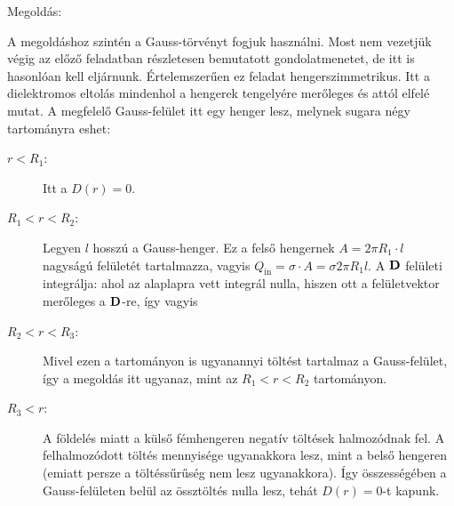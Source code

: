 
\ifdefined\megoldas

 Megoldás: 

 A megoldáshoz szintén a Gauss-törvényt fogjuk használni. Most nem vezetjük végig az előző feladatban részletesen bemutatott gondolatmenetet, de itt is hasonlóan kell eljárnunk. Értelemszerűen ez feladat hengerszimmetrikus. Itt a dielektromos eltolás mindenhol a hengerek tengelyére merőleges és attól elfelé mutat. A megfelelő Gauss-felület itt egy henger lesz, melynek sugara négy tartományra eshet:
  
 \begin{description}
  \item[$r<R_1$:] 
   Itt a $D(r)=0$. 
  \item[$R_1<r<R_2$:] 
   Legyen $l$ hosszú a Gauss-henger. Ez a felső hengernek $A=2\pi R_1\cdot l$ nagyságú felületét tartalmazza, vagyis $Q_\text{in}=\sigma\cdot A=\sigma 2\pi R_1 l$. A $\mathbf{D}$ felületi integrálja:
   ahol az alaplapra vett integrál nulla, hiszen ott a felületvektor merőleges a $\mathbf{D}$-re, így
   vagyis
  \item[$R_2<r<R_3$:] 
   Mivel ezen a tartományon is ugyanannyi töltést tartalmaz a Gauss-felület, így a megoldás itt ugyanaz, mint az $R_1<r<R_2$ tartományon. 
   
  \item[$R_3<r$:] 
   A földelés miatt a külső fémhengeren negatív töltések halmozódnak fel. A felhalmozódott töltés mennyisége ugyanakkora lesz, mint a belső hengeren (emiatt persze a töltéssűrűség nem lesz ugyanakkora). Így összességében a Gauss-felületen belül az össztöltés nulla lesz, tehát $D(r)=0$-t kapunk.
 \end{description}
  
